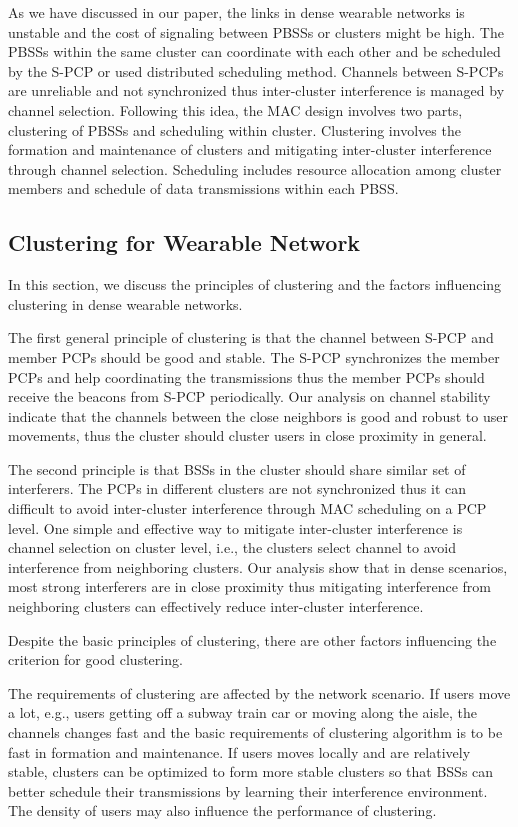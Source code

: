 \documentclass[10pt, conference, letterpaper]{IEEEtran}
\begin{document}
As we have discussed in our paper, the links in dense wearable networks is unstable and the cost of signaling between PBSSs or clusters might be high. The PBSSs within the same cluster can coordinate with each other and be scheduled by the S-PCP or used distributed scheduling method. Channels between S-PCPs are unreliable and not synchronized thus inter-cluster interference is managed by channel selection. Following this idea, the MAC design involves two parts, clustering of PBSSs and scheduling within cluster.   
Clustering involves the formation and maintenance of clusters and mitigating inter-cluster interference through channel selection. 
Scheduling includes resource allocation among cluster members and schedule of data transmissions within each PBSS.

\subsection{Clustering for Wearable Network}\label{section:MAC:clustering}
In this section, we discuss the principles of clustering and the factors influencing clustering in dense wearable networks.

The first general principle of clustering is that the channel between S-PCP and member PCPs should be good and stable. The S-PCP synchronizes the member PCPs and help coordinating the transmissions thus the member PCPs should receive the beacons from S-PCP periodically. Our analysis on channel stability indicate that the channels between the close neighbors is good and robust to user movements, thus the cluster should cluster users in close proximity in general. 

The second principle is that BSSs in the cluster should share similar set of interferers. The PCPs in different clusters are not synchronized thus it can difficult to avoid inter-cluster interference through MAC scheduling on a PCP level. One simple and effective way to mitigate inter-cluster interference is channel selection on cluster level, i.e., the clusters select channel to avoid interference from neighboring clusters. Our analysis show that in dense scenarios, most strong interferers are in close proximity thus mitigating interference from neighboring clusters can effectively reduce inter-cluster interference. 

Despite the basic principles of clustering, there are other factors influencing the criterion for good clustering.

The requirements of clustering are affected by the network scenario. If users move a lot, e.g., users getting off a subway train car or moving along the aisle, the channels changes fast and the basic requirements of clustering algorithm is to be fast in formation and maintenance. If users moves locally and are relatively stable, clusters can be optimized to form more stable clusters so that BSSs can better schedule their transmissions by learning their interference environment. The density of users may also influence the performance of clustering.
\end{document}

